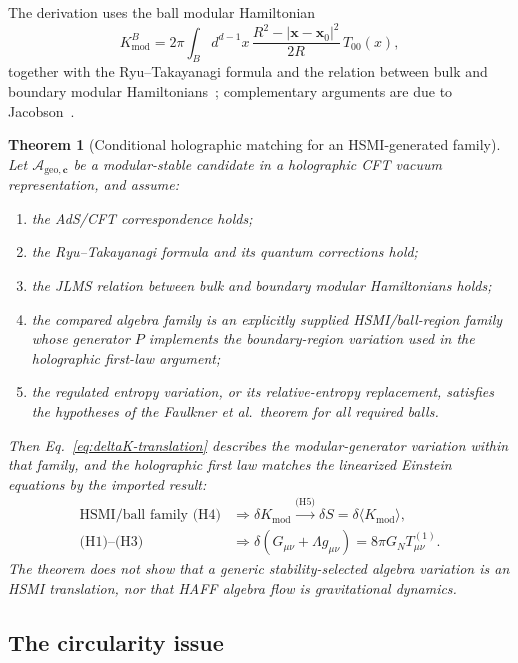 \documentclass[12pt,a4paper]{article}
\newtheorem{theorem}{Theorem}[section]
\begin{document}
The derivation uses the ball modular Hamiltonian~\cite{CasiniHuertaMyers2011}
\begin{equation}
K_{\mathrm{mod}}^B = 2\pi \int_B d^{d-1}x\, \frac{R^2 - |\mathbf{x} - \mathbf{x}_0|^2}{2R}\, T_{00}(x),
\end{equation}
together with the Ryu--Takayanagi formula and the relation between bulk and boundary modular Hamiltonians~\cite{JLMS2016}; complementary arguments are due to Jacobson~\cite{Jacobson2016}.

\begin{theorem}[Conditional holographic matching for an HSMI-generated family]
\label{thm:linearized}
Let $\mathcal{A}_{\mathrm{geo},\mathbf{c}}$ be a modular-stable candidate in a holographic CFT vacuum representation, and assume:
\begin{enumerate}
\item[(H1)] the AdS/CFT correspondence holds;
\item[(H2)] the Ryu--Takayanagi formula and its quantum corrections hold;
\item[(H3)] the JLMS relation between bulk and boundary modular Hamiltonians holds;
\item[(H4)] the compared algebra family is an explicitly supplied HSMI/ball-region family whose generator $P$ implements the boundary-region variation used in the holographic first-law argument;
\item[(H5)] the regulated entropy variation, or its relative-entropy replacement, satisfies the hypotheses of the Faulkner et al.\ theorem for all required balls.
\end{enumerate}
Then Eq.~\eqref{eq:deltaK-translation} describes the modular-generator variation within that family, and the holographic first law matches the linearized Einstein equations by the imported result:
\begin{align}
 \text{HSMI/ball family (H4)}&\Longrightarrow\delta K_{\mathrm{mod}}
 \xrightarrow{\text{(H5)}}\delta S=\delta\langle K_{\mathrm{mod}}\rangle,
 \nonumber\\
 \text{(H1)--(H3)}&\Longrightarrow
 \delta(G_{\mu\nu}+\Lambda g_{\mu\nu})=8\pi G_NT_{\mu\nu}^{(1)}.
\end{align}
The theorem does not show that a generic stability-selected algebra variation is an HSMI translation, nor that HAFF algebra flow is gravitational dynamics.
\end{theorem}

\subsection{The circularity issue}
\end{document}
